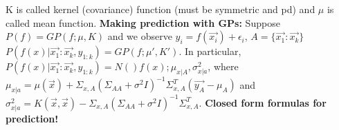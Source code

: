 K is called kernel (covariance) function (must be symmetric and pd) and $\mu$ is called mean function.
\textbf{Making prediction with GPs:} Suppose $P(f)=GP(f;\mu, K)$ and we observe $y_i=f(\overrightarrow{x_i})+\epsilon_i$, $A=\{\overrightarrow{x_1}:\overrightarrow{x_k}\}$
$P(f(x)|\overrightarrow{x_1}:\overrightarrow{x_k},y_{1:k})=GP(f;\mu ', K')$.  In particular, $P(f(x)|\overrightarrow{x_1}:\overrightarrow{x_k},y_{1:k})=N()f(x);\mu_{x|A}, \sigma^2_{x|a}$, where $\mu_{x|a}=\mu(\overrightarrow{x})+\Sigma_{x,A}(\Sigma_{AA}+\sigma^2I)^{-1}\Sigma^T_{x,A}(\overrightarrow{y_A}-\mu_A)$ and $\sigma^2_{x|a}=K(\overrightarrow{x},\overrightarrow{x})-\Sigma_{x,A}(\Sigma_{AA}+\sigma^2I)^{-1}\Sigma^T_{x,A}$. \textbf{Closed form formulas for prediction!}





